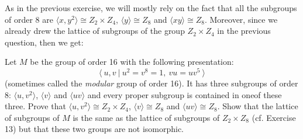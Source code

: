 \begin{solution}
    As in the previous exercise, we will mostly rely on the fact that all the subgroups of order 8 are $\langle x, y^2 \rangle \cong Z_2\times Z_4$, $\langle y \rangle \cong Z_8$ and $\langle xy \rangle \cong Z_8$. Moreover, since we already drew the lattice of subgroups of the group $Z_2 \times Z_4$ in the previous question, then we get:
    \begin{center}
    \end{center}
\end{solution}

\begin{exercise}
    Let $M$ be the group of order 16 with the following presentation:
    $$\langle \ u,v \ | \ u^2 = v^8 = 1, \ vu = uv^5 \ \rangle$$
    (sometimes called the \textit{modular} group of order 16). It has three subgroups of order 8: $\langle u,v^2 \rangle$, $\langle v \rangle$ and $\langle uv \rangle$ and every proper subgroup is contained in oneof these three. Prove that $\langle u, v^2 \rangle \cong Z_2\times Z_4$, $\langle v \rangle \cong Z_8$ and $\langle uv \rangle \cong Z_8$. Show that the lattice of subgroups of $M$ is the same as the lattice of subgroups of $Z_2 \times Z_8$ (cf. Exercise 13) but that these two groups are not isomorphic. \\
\end{exercise}

